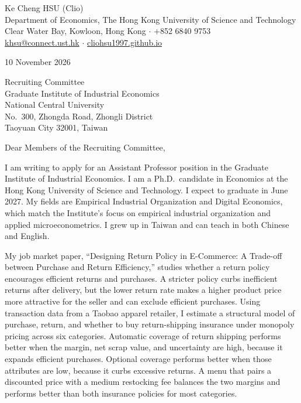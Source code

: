 \documentclass[11pt]{article}
\begin{document}
\begin{flushleft}
Ke Cheng HSU (Clio) \\
Department of Economics, The Hong Kong University of Science and Technology \\
Clear Water Bay, Kowloon, Hong Kong $\cdot$ +852 6840 9753 \\
\href{mailto:khsu@connect.ust.hk}{khsu@connect.ust.hk} $\cdot$ \href{https://cliohsu1997.github.io/}{cliohsu1997.github.io}
\end{flushleft}

10 November 2026

\vspace{0.12em}
Recruiting Committee \\
Graduate Institute of Industrial Economics \\
National Central University \\
No.\ 300, Zhongda Road, Zhongli District \\
Taoyuan City 32001, Taiwan

\vspace{0.12em}
Dear Members of the Recruiting Committee,

I am writing to apply for an Assistant Professor position in the Graduate Institute of Industrial Economics. I am a Ph.D.\ candidate in Economics at the Hong Kong University of Science and Technology. I expect to graduate in June 2027. My fields are Empirical Industrial Organization and Digital Economics, which match the Institute's focus on empirical industrial organization and applied microeconometrics. I grew up in Taiwan and can teach in both Chinese and English.

My job market paper, ``Designing Return Policy in E-Commerce: A Trade-off between Purchase and Return Efficiency,'' studies whether a return policy encourages efficient returns and purchases. A stricter policy curbs inefficient returns after delivery, but the lower return rate makes a higher product price more attractive for the seller and can exclude efficient purchases. Using transaction data from a Taobao apparel retailer, I estimate a structural model of purchase, return, and whether to buy return-shipping insurance under monopoly pricing across six categories. Automatic coverage of return shipping performs better when the margin, net scrap value, and uncertainty are high, because it expands efficient purchases. Optional coverage performs better when those attributes are low, because it curbs excessive returns. A menu that pairs a discounted price with a medium restocking fee balances the two margins and performs better than both insurance policies for most categories.
\end{document}
